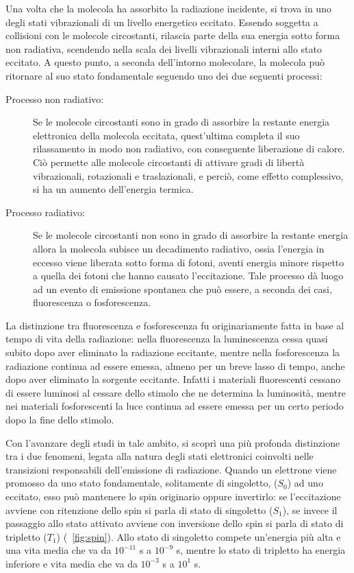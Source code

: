 Una volta che la molecola ha assorbito la radiazione incidente, si trova in uno degli stati vibrazionali di un livello energetico eccitato. 
Essendo soggetta a collisioni con le molecole circostanti, rilascia parte della sua energia sotto forma non radiativa, scendendo nella scala dei livelli vibrazionali interni allo stato eccitato. 
A questo punto, a seconda dell'intorno molecolare, la molecola può ritornare al suo stato fondamentale seguendo uno dei due seguenti processi:
\begin{description}
 \item [Processo non radiativo:]
Se le molecole circostanti sono in grado di assorbire la restante energia elettronica della molecola eccitata, quest'ultima completa il suo rilassamento in modo non radiativo, con conseguente liberazione di calore. 
Ciò permette alle molecole circostanti di attivare gradi di libertà vibrazionali, rotazionali e traslazionali, e perciò, come effetto complessivo, si ha un aumento dell'energia termica.
 \item [Processo radiativo:]
Se le molecole circostanti non sono in grado di assorbire la restante energia allora la molecola subisce un decadimento radiativo, ossia l'energia in eccesso viene liberata sotto forma di fotoni, aventi energia minore rispetto a quella dei fotoni che hanno causato l'eccitazione. 
Tale processo dà luogo ad un evento di emissione spontanea che può essere, a seconda dei casi, fluorescenza o fosforescenza.
\end{description}
La distinzione tra fluorescenza e fosforescenza fu originariamente fatta in base al tempo di vita della radiazione: nella fluorescenza la luminescenza cessa quasi subito dopo aver eliminato la radiazione eccitante, mentre nella fosforescenza la radiazione continua ad essere emessa, almeno per un breve lasso di tempo, anche dopo aver eliminato la sorgente eccitante. 
Infatti i materiali fluorescenti cessano di essere luminosi al cessare dello stimolo che ne determina la luminosità, mentre nei materiali fosforescenti la luce continua ad essere emessa per un certo periodo dopo la fine dello stimolo.

Con l'avanzare degli studi in tale ambito, si scoprì una più profonda distinzione tra i due fenomeni, legata alla natura degli stati elettronici coinvolti nelle transizioni responsabili dell'emissione di radiazione.
Quando un elettrone viene promosso da uno stato fondamentale, solitamente di singoletto, ($S_0$) ad uno eccitato, esso può mantenere lo spin originario oppure invertirlo: se l'eccitazione avviene con ritenzione dello spin si parla di stato di singoletto ($S_1$), se invece il passaggio allo stato attivato avviene con inversione dello spin si parla di stato di tripletto ($T_1$) (\figurename~\ref{fig:spin}). 
Allo stato di singoletto compete un'energia più alta e una vita media che va da $10^{-11}$ s a $10^{-9}$ s, mentre lo stato di tripletto ha energia inferiore e vita media che va da $10^{-3}$ s a $10^{1}$ s.

